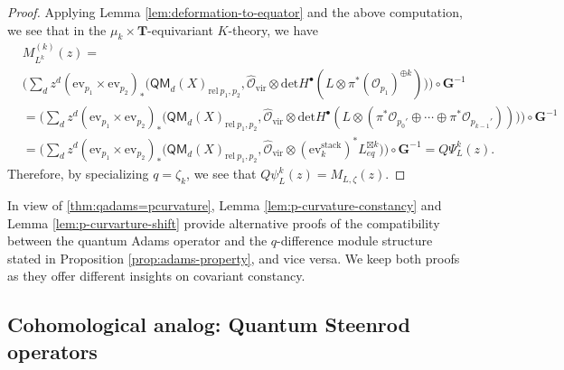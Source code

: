 \documentclass[reqno]{amsart}
\numberwithin{equation}{section}
\numberwithin{equation}{section}
\numberwithin{equation}{section}
\theoremstyle{definition}
\theoremstyle{remark}
\theoremstyle{remark}
\begin{document}
\begin{proof}
    Applying Lemma \ref{lem:deformation-to-equator} and the above computation, we see that in the $\mu_k \times \mathbf{T}$-equivariant $K$-theory, we have
    \begin{equation}
    \begin{aligned}
        &M_{L^k}^{(k)}(z) = \\
        & \big( \sum_d z^d (\mathrm{ev}_{p_1} \times \mathrm{ev}_{p_2})_* \big( \mathsf{QM}_{d}(X)_{\mathrm{rel} \ p_1, p_2}, \hat{\mathcal{O}}_{\mathrm{vir}} \otimes\mathrm{det} H^{\bullet}(L \otimes \pi^*(\mathcal{O}_{p_1})^{\oplus k}) \big) \big)\circ \mathbf{G}^{-1} \\
        &= \big( \sum_d z^d (\mathrm{ev}_{p_1} \times \mathrm{ev}_{p_2})_* \big( \mathsf{QM}_{d}(X)_{\mathrm{rel} \ p_1, p_2}, \hat{\mathcal{O}}_{\mathrm{vir}} \otimes\mathrm{det} H^{\bullet}(L \otimes (\pi^* \mathcal{O}_{p_0'} \oplus \cdots \oplus \pi^* \mathcal{O}_{p_{k-1}'})) \big) \big)\circ \mathbf{G}^{-1} \\
        &= \big( \sum_d z^d (\mathrm{ev}_{p_1} \times \mathrm{ev}_{p_2})_* \big( \mathsf{QM}_{d}(X)_{\mathrm{rel} \ p_1, p_2}, \hat{\mathcal{O}}_{\mathrm{vir}} \otimes (\mathrm{ev}^{\mathrm{stack}}_k)^* L^{\boxtimes k}_{eq} \big) \big)\circ \mathbf{G}^{-1} = Q\Psi^k_{L}(z).
    \end{aligned}
    \end{equation}
    Therefore, by specializing $q = \zeta_k$, we see that $Q\psi_L^k(z) = M_{L, \zeta} (z)$.
\end{proof}

In view of \cref{thm:qadams=pcurvature}, Lemma \ref{lem:p-curvature-constancy} and Lemma \ref{lem:p-curvarture-shift} provide alternative proofs of the compatibility between the quantum Adams operator and the $q$-difference module structure stated in Proposition \ref{prop:adams-property}, and vice versa. We keep both proofs as they offer different insights on covariant constancy.

\subsection{Cohomological analog: Quantum Steenrod operators}\label{ssec:quantumSteenrod-defn}
\end{document}
